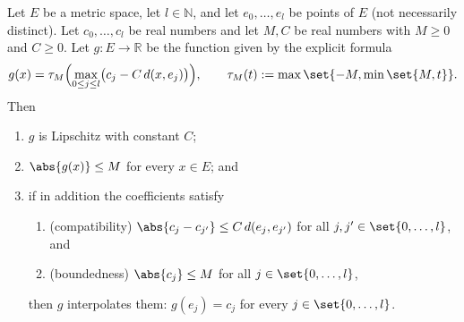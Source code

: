\begin{lemma}
  Let $E$ be a metric space, let $l \in \mathbb{N}$, and let $e_0,\dots,e_l$ be points of $E$ (not
  necessarily distinct). Let $c_0,\dots,c_l$ be real numbers and let $M, C$ be real numbers with
  $M \ge 0$ and $C \ge 0$. Let $g \colon E \to \mathbb{R}$ be the function given by the explicit
  formula
  \[
    g(x) = \tau_M\Bigl(\max_{0 \le j \le l}\bigl(c_j - C\,d(x,e_j)\bigr)\Bigr)
    ,
    \qquad
    \tau_M(t) := \max\set{-M, \min\set{M, t}}
    .
  \]
  Then
  \begin{enumerate}
  \item $g$ is Lipschitz with constant $C$;
  \item $\abs{g(x)} \le M$ for every $x \in E$; and
  \item if in addition the coefficients satisfy
    \begin{enumerate}
    \item (compatibility) $\abs{c_j - c_{j'}} \le C\,d(e_j,e_{j'})$ for all $j,j' \in
      \set{0,\dots,l}$, and
    \item (boundedness) $\abs{c_j} \le M$ for all $j \in \set{0,\dots,l}$,
    \end{enumerate}
    then $g$ interpolates them: $g(e_j) = c_j$ for every $j \in \set{0,\dots,l}$.
  \end{enumerate}
\end{lemma}
